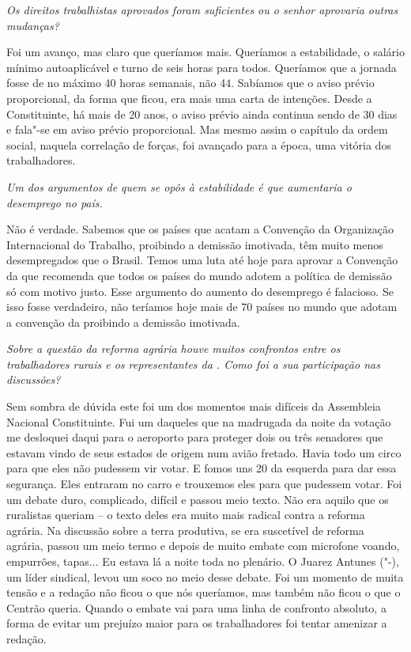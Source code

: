 \medskip

\noindent\emph{Os direitos trabalhistas aprovados foram suficientes ou o senhor
aprovaria outras mudanças?}

Foi um avanço, mas claro que queríamos mais. Queríamos a
estabilidade, o salário mínimo autoaplicável e turno de seis horas para
todos. Queríamos que a jornada fosse de no máximo 40 horas semanais, não
44. Sabíamos que o aviso prévio proporcional, da forma que ficou, era
mais uma carta de intenções. Desde a Constituinte, há mais de 20 anos, o
aviso prévio ainda continua sendo de 30 dias e fala"-se em aviso prévio
proporcional. Mas mesmo assim o capítulo da ordem social, naquela
correlação de forças, foi avançado para a época, uma vitória dos
trabalhadores.

\medskip

\noindent\emph{Um dos argumentos de quem se opôs à estabilidade é que
aumentaria o desemprego no país.}

Não é verdade. Sabemos que os países que acatam a
Convenção da Organização Internacional do Trabalho, proibindo a demissão
imotivada, têm muito menos desempregados que o Brasil. Temos uma luta
até hoje para aprovar a Convenção da  que recomenda que todos os
países do mundo adotem a política de demissão só com motivo justo. Esse
argumento do aumento do desemprego é falacioso. Se isso fosse
verdadeiro, não teríamos hoje mais de 70 países no mundo que adotam a
convenção da  proibindo a demissão imotivada.

\medskip

\noindent\emph{Sobre a questão da reforma agrária houve muitos confrontos entre
os trabalhadores rurais e os representantes da . Como foi a sua
participação nas discussões?}

Sem sombra de dúvida este foi um dos momentos mais
difíceis da Assembleia Nacional Constituinte. Fui um daqueles que na
madrugada da noite da votação me desloquei daqui para o aeroporto para
proteger dois ou três senadores que estavam vindo de seus estados de
origem num avião fretado. Havia todo um circo para que eles não pudessem
vir votar. E fomos uns 20 da esquerda para dar essa segurança. Eles
entraram no carro e trouxemos eles para que pudessem votar. Foi um
debate duro, complicado, difícil e passou meio texto. Não era aquilo que
os ruralistas queriam -- o texto deles era muito mais radical contra a
reforma agrária. Na discussão sobre a terra produtiva, se era suscetível
de reforma agrária, passou um meio termo e depois de muito embate com
microfone voando, empurrões, tapas... Eu estava lá a noite toda no
plenário. O Juarez Antunes ("-), um líder sindical, levou um soco no
meio desse debate. Foi um momento de muita tensão e a redação não ficou
o que nós queríamos, mas também não ficou o que o Centrão queria. Quando
o embate vai para uma linha de confronto absoluto, a forma de evitar um
prejuízo maior para os trabalhadores foi tentar amenizar a redação.

